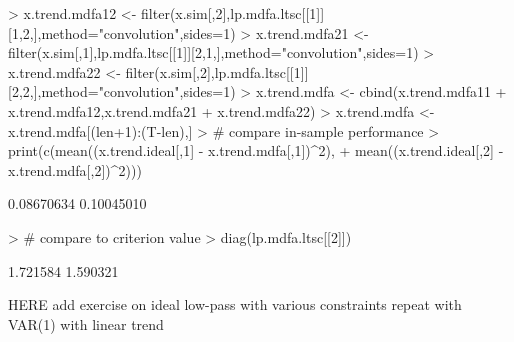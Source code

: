 \documentclass[a4paper]{book}
\begin{document}
\begin{Schunk}
\begin{Sinput}
> x.trend.mdfa12 <- filter(x.sim[,2],lp.mdfa.ltsc[[1]][1,2,],method="convolution",sides=1)
> x.trend.mdfa21 <- filter(x.sim[,1],lp.mdfa.ltsc[[1]][2,1,],method="convolution",sides=1)
> x.trend.mdfa22 <- filter(x.sim[,2],lp.mdfa.ltsc[[1]][2,2,],method="convolution",sides=1)
> x.trend.mdfa <- cbind(x.trend.mdfa11 + x.trend.mdfa12,x.trend.mdfa21 + x.trend.mdfa22)
> x.trend.mdfa <- x.trend.mdfa[(len+1):(T-len),] 
> # compare in-sample performance
> print(c(mean((x.trend.ideal[,1] - x.trend.mdfa[,1])^2),
+ 	mean((x.trend.ideal[,2] - x.trend.mdfa[,2])^2)))
\end{Sinput}
\begin{Soutput}
[1] 0.08670634 0.10045010
\end{Soutput}
\begin{Sinput}
> # compare to criterion value
> diag(lp.mdfa.ltsc[[2]])
\end{Sinput}
\begin{Soutput}
[1] 1.721584 1.590321
\end{Soutput}
\end{Schunk}
 
 




HERE  add exercise on ideal low-pass with various constraints 
  repeat with VAR(1) with linear trend
\end{document}
